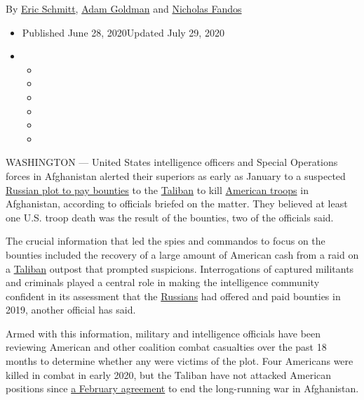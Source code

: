 By \href{https://www.nytimes.com/by/eric-schmitt}{Eric Schmitt},
\href{https://www.nytimes.com/by/adam-goldman}{Adam Goldman} and
\href{https://www.nytimes.com/by/nicholas-fandos}{Nicholas Fandos}

\begin{itemize}
\item
  Published June 28, 2020Updated July 29, 2020
\item
  \begin{itemize}
  \item
  \item
  \item
  \item
  \item
  \item
  \end{itemize}
\end{itemize}

WASHINGTON --- United States intelligence officers and Special
Operations forces in Afghanistan alerted their superiors as early as
January to a suspected
\href{https://www.nytimes.com/2020/07/29/us/politics/trump-putin-bounties.html}{Russian
plot to pay bounties} to the
\href{https://www.nytimes.com/2020/06/30/us/politics/russian-bounties-afghanistan-intelligence.html}{Taliban}
to kill
\href{https://www.nytimes.com/2020/06/30/us/politics/russian-bounties-afghanistan-intelligence.html}{American
troops} in Afghanistan, according to officials briefed on the matter.
They believed at least one U.S. troop death was the result of the
bounties, two of the officials said.

The crucial information that led the spies and commandos to focus on the
bounties included the recovery of a large amount of American cash from a
raid on a
\href{https://www.nytimes.com/2020/07/01/world/asia/afghan-russia-bounty-middleman.html}{Taliban}
outpost that prompted suspicions. Interrogations of captured militants
and criminals played a central role in making the intelligence community
confident in its assessment that the
\href{https://www.nytimes.com/2020/06/29/us/politics/trump-russia-plot-afghanistan.html}{Russians}
had offered and paid bounties in 2019, another official has said.

Armed with this information, military and intelligence officials have
been reviewing American and other coalition combat casualties over the
past 18 months to determine whether any were victims of the plot. Four
Americans were killed in combat in early 2020, but the Taliban have not
attacked American positions since
\href{https://www.nytimes.com/2020/02/29/world/asia/us-taliban-deal.html}{a
February agreement} to end the long-running war in Afghanistan.

